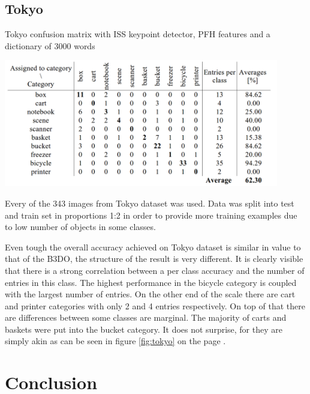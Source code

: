 	\subsection{Tokyo}
	\begin{table}[!ht]
	\centering
	\caption{Tokyo confusion matrix with ISS keypoint detector, PFH features and a dictionary of 3000 words}
	\includegraphics[width=0.9\textwidth]{figs/tokyo_conf_matrix}	
	\label{tab:tokyo_conf_matrix}
	\end{table}
	
	Every of the 343 images from Tokyo dataset was used. Data was split into test and train set in proportions 1:2 in order to provide more training examples due to low number of objects in some classes.
	
	Even tough the overall accuracy achieved on Tokyo dataset is similar in value to that of the B3DO, the structure of the result is very different. It is clearly visible that there is a strong correlation between a per class accuracy and the number of entries in this class. The highest performance in the bicycle category is coupled with the largest number of entries. On the other end of the scale there are cart and printer categories with only 2 and 4 entries respectively. On top of that there are differences between some classes are marginal. The majority of carts and baskets were put into the bucket category. It does not surprise, for they are simply akin as can be seen in figure \ref{fig:tokyo} on the page \pageref{fig:tokyo}.
	
\section{Conclusion}
	